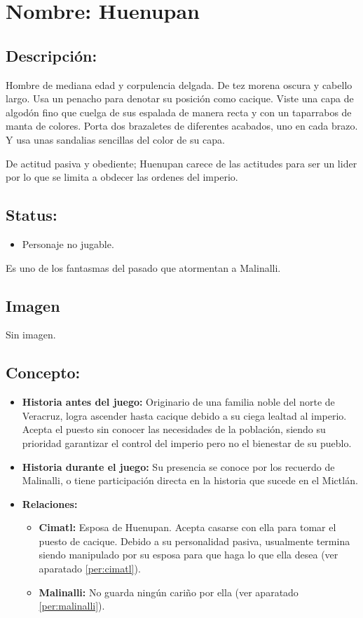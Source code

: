 \section{Nombre: Huenupan}  \label{per:huenupan}
\subsection{Descripción:} 
Hombre de mediana edad y corpulencia delgada. De tez morena oscura y cabello largo. Usa un penacho para denotar su posición como cacique. Viste una capa de algodón fino que cuelga de sus espalada de manera recta y con un taparrabos de manta de colores. Porta dos brazaletes de diferentes acabados, uno en cada brazo. Y usa unas sandalias sencillas del color de su capa.     
\\
\par
De actitud pasiva y obediente; Huenupan carece de las actitudes para ser un lider por lo que se limita a obdecer las ordenes del imperio. 
\subsection{Status:}
\begin{itemize}
		\item Personaje no jugable.
	\end{itemize}
Es uno de los fantasmas del pasado que atormentan a Malinalli.
\subsection{Imagen}
	Sin imagen. 
\subsection{Concepto:}
\begin{itemize}
	\item \textbf{Historia antes del juego:}
	Originario de una familia noble del  norte de Veracruz, logra ascender hasta cacique debido a su ciega lealtad al imperio. Acepta el puesto sin conocer las necesidades de la población, siendo su prioridad garantizar el control del imperio pero no el bienestar de su pueblo.  
	\item \textbf{Historia durante el juego:}
	Su presencia se conoce por los recuerdo de Malinalli, o tiene participación directa en la historia que sucede en el Mictlán.
	\item \textbf{Relaciones:}
	\begin{itemize}
		\item \textbf{Cimatl:} Esposa de Huenupan. Acepta casarse con ella para tomar el puesto de cacique. Debido a su personalidad pasiva, usualmente termina siendo manipulado por su esposa para que haga lo que ella desea (ver aparatado \ref{per:cimatl}). 
		\item \textbf{Malinalli:} No guarda ningún cariño por ella (ver aparatado \ref{per:malinalli}). 
	\end{itemize}                     
\end{itemize}

